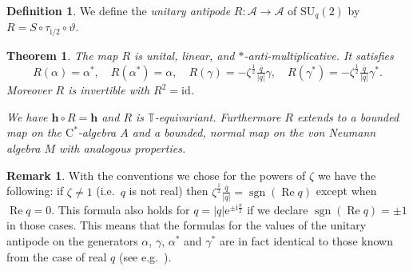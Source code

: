 \documentclass[12pt,reqno,a4paper]{amsart}
\newtheorem{theorem}[proposition]{Theorem}
\theoremstyle{definition}
\newtheorem{definition}[proposition]{Definition}
\newtheorem{remark}[proposition]{Remark}
\newcommand{\cst}{\ensuremath{\mathrm{C}^*}}
\newcommand{\comp}{\circ}
\newcommand{\ee}{\mathrm{e}}
\newcommand{\id}{\mathrm{id}}
\newcommand{\ii}{\mathrm{i}}
\newcommand{\TT}{\mathbb{T}}
\newcommand{\cA}{\mathscr{A}}
\newcommand{\bh}{{\boldsymbol{h}}}
\newcommand{\SU}{\mathrm{SU}}
\numberwithin{equation}{section}
\begin{document}
\begin{definition}\label{def-R}
We define the \emph{unitary antipode} $R\colon\cA\to\cA$ of $\SU_q(2)$ by $R=S\comp\tau_{\ii/2}\comp\vartheta$.
\end{definition}

\begin{theorem}\label{thm-prop3}
The map $R$ is unital, linear, and $*$-anti-multiplicative. It satisfies
\begin{equation}\label{eq-eq63}
R(\alpha)=\alpha^*,\quad
R(\alpha^*)=\alpha,\quad
R(\gamma)=-\zeta^{\frac{1}{2}}\tfrac{\overline{q}}{|q|}\gamma,\quad
R(\gamma^*)=-\zeta^{\frac{1}{2}}\tfrac{\overline{q}}{|q|}\gamma^*.
\end{equation}
Moreover $R$ is invertible with $R^2=\id$.

We have $\bh\comp R=\bh$ and $R$ is $\TT$-equivariant. Furthermore $R$ extends to a bounded map on the \cst-algebra $A$ and a bounded, normal map on the von Neumann algebra $M$ with analogous properties.
\end{theorem}

\begin{remark}
With the conventions we chose for the powers of $\zeta$ we have the following: if $\zeta\neq 1$ (i.e.~$q$ is not real) then $\zeta^{\frac{1}{2}}\tfrac{\overline{q}}{|q|}=\operatorname{sgn}(\operatorname{Re}{q})$ except when $\operatorname{Re}{q}=0$. This formula also holds for $q=|q|\ee^{\pm\ii\frac{\pi}{2}}$ if we declare $\operatorname{sgn}(\operatorname{Re}{q})=\pm 1$ in those cases. This means that the formulas for the values of the unitary antipode on the generators $\alpha$, $\gamma$, $\alpha^*$ and $\gamma^*$ are in fact identical to those known from the case of real $q$ (see e.g.~\cite[Proof of Proposition 7.4]{modular}).
\end{remark}
\end{document}
